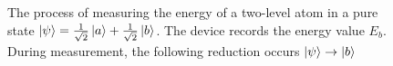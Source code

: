 \begin{figure}
\centering



\caption{The process of measuring the energy of a two-level atom in a
pure state $\left|\psi\right> = 
\frac{1}{\sqrt{2}}\ket{a} + \frac{1}{\sqrt{2}}\ket{b}$.
The device records the energy value $E_b$. During measurement,
the following reduction occurs $\left|\psi\right> \to \ket{b}$
}
\label{fig:add:mesure_ex_b}
\end{figure}
